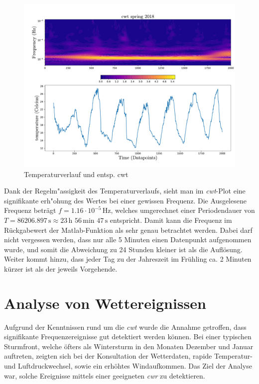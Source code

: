 \begin{refsection}
\begin{figure}[h]
	\centering
	\includegraphics[width=1\textwidth]{papers/wwt/images/data_spring.pdf}
	\caption{Temperaturverlauf und entsp. cwt}
	\label{fig:cwt_zoom}
\end{figure}

Dank der Regelm"assigkeit des Temperaturverlaufs, sieht man im \textit{cwt}-Plot eine signifikante erh"ohung des Wertes bei einer gewissen Frequenz.
Die Ausgelesene Frequenz beträgt $f = 1.16\cdot10^{-5} \,\text{Hz}$, welches umgerechnet einer Periodendauer von $T = 86206.897\,\text{s}\approx 23\,\text{h }56\,\text{min } 47\,\text{s}$ entspricht.
Damit kann die Frequenz im Rückgabewert der Matlab-Funktion als sehr genau betrachtet werden.
Dabei darf nicht vergessen werden, dass nur alle 5 Minuten einen Datenpunkt aufgenommen wurde, und somit die Abweichung zu 24 Stunden kleiner ist als die Auflösung.
Weiter kommt hinzu, dass jeder Tag zu der Jahreszeit im Frühling ca. 2 Minuten kürzer ist als der jeweils Vorgehende.\cite{online:sunset_time}




\section{Analyse von Wettereignissen}
Aufgrund der Kenntnissen rund um die \textit{cwt} wurde die Annahme getroffen, dass signifikante Frequenzereignisse gut detektiert werden können.
Bei einer typischen Sturmfront, welche öfters als Wintersturm in den Monaten Dezember und Januar auftreten, zeigten sich bei der Konsultation der Wetterdaten, rapide Temperatur- und Luftdruckwechsel, sowie ein erhöhtes Windaufkommen.
Das Ziel der Analyse war, solche Ereignisse mittels einer geeigneten \textit{cwr} zu detektieren.

\end{refsection}
